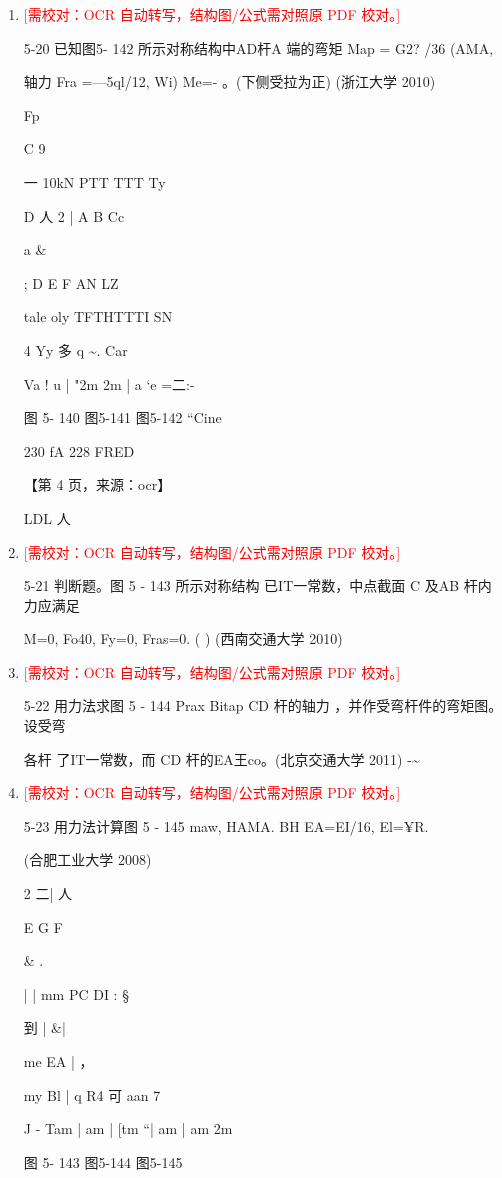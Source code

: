 \documentclass[UTF8,12pt,a4paper,openany]{ctexbook}
\newcommand{\TODO}[1]{\textcolor{red}{[需校对：#1]}}
\begin{document}
\begin{enumerate}[label=\textbf{\arabic*.},leftmargin=2em]
\item \TODO{OCR 自动转写，结构图/公式需对照原 PDF 校对。}\par 5-20 已知图5- 142 所示对称结构中AD杆A 端的弯矩 Map = G2? /36 (AMA,\par 轴力 Fra =—5ql/12, Wi) Me=- 。(下侧受拉为正) (浙江大学 2010)\par Fp\par C             9\par 一         10kN   PTT TTT Ty\par D        人      2    |           A  B       Cc\par a                                \&\par ;                                                           D          E          F     AN LZ\par tale oly                       TFTHTTTI SN\par 4   Yy         多                                     q          \textasciitilde{}.      Car\par Va  !   u     | "2m    2m  |    a ‘e =二:-\par 图 5- 140             图5-141               图5-142    “Cine\par 230                                                   fA 228 FRED\par \par 【第 4 页，来源：ocr】\par LDL  人
\item \TODO{OCR 自动转写，结构图/公式需对照原 PDF 校对。}\par 5-21 判断题。图 5 - 143 所示对称结构 已IT一常数，中点截面 C 及AB 杆内力应满足\par M=0, Fo40, Fy=0, Fras=0. ( ) (西南交通大学 2010)
\item \TODO{OCR 自动转写，结构图/公式需对照原 PDF 校对。}\par 5-22 用力法求图 5 - 144 Prax Bitap CD 杆的轴力 ，并作受弯杆件的弯矩图。设受弯\par 各杆 了IT一常数，而 CD 杆的EA王co。(北京交通大学 2011) -\textasciitilde{}
\item \TODO{OCR 自动转写，结构图/公式需对照原 PDF 校对。}\par 5-23 用力法计算图 5 - 145 maw, HAMA. BH EA=EI/16, El=¥R.\par (合肥工业大学 2008)\par 2 二|                    人\par E      G     F\par \& .\par | |              mm            PC             DI                :                            §\par 到              |                               \&|\par me      EA                                 |       ，\par my          Bl | q         R4        可      aan      7\par J       -     Tam | am |     [tm “| am | am 2m\par 图 5- 143              图5-144                    图5-145

\end{enumerate}
\end{document}
